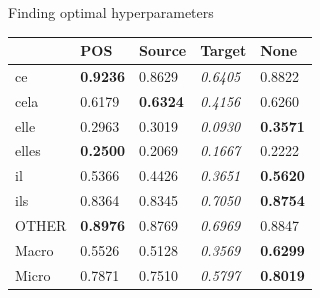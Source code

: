 \documentclass[dvipsnames,a0paper,portrait]{baposter}
\begin{document}
\begin{poster}
\begin{posterbox}[name=cohesion,column=1,aligned=motivation]{Finding optimal hyperparameters}
\begin{center}
\begin{tabular}{lllll}
     & POS & Source & Target & None \\ \midrule
ce    & \textbf{0.9236}   & 0.8629         & \emph{0.6405}         &  0.8822 \\
cela  & 0.6179   & \textbf{0.6324}         & \emph{0.4156}         &  0.6260 \\
elle  & 0.2963   & 0.3019         & \emph{0.0930}          &  \textbf{0.3571} \\
elles & \textbf{0.2500}   & 0.2069         & \emph{0.1667}         &  0.2222 \\
il    & 0.5366   & 0.4426         & \emph{0.3651}         &  \textbf{0.5620} \\
ils   & 0.8364   & 0.8345         & \emph{0.7050}         &  \textbf{0.8754} \\
OTHER & \textbf{0.8976}   & 0.8769       &  \emph{0.6969}         &  0.8847 \\
\midrule
Macro & 0.5526   & 0.5128          & \emph{0.3569}          &  \textbf{0.6299} \\
Micro & 0.7871   & 0.7510          & \emph{0.5797}          &  \textbf{0.8019} \\
\hline
\end{tabular}
\end{center}



\end{posterbox}
\end{poster}
\end{document}
